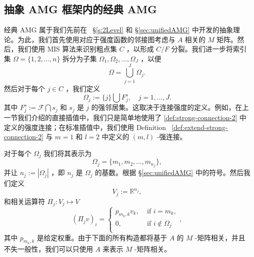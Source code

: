 \documentclass[12pt]{acta_2011xz}
\begin{document}
   \subsection{抽象 AMG 框架内的经典 AMG  }       \label{sec:CAMG-coarse}    经典 AMG 属于我们先前在~    \S       \ref{s:2Level}    和    \S       \ref{sec:unifiedAMG}    中开发的抽象理论。为此，我们首先使用对应于强度函数的邻接图考虑与    $A$    相关的    $M$    矩阵。然后，我们使用 MIS 算法来识别粗点集    $C$    ，以形成
   $C/F$    分裂。我们进一步将索引集    $\Omega= \{ 1, 2,
\dots, n \} $    拆分为子集    $\Omega_1, \Omega_2, \dots, \Omega_J$    ，以便
   \begin{equation}\label{Omegaj}
\Omega=\bigcup_{j=1}^J\Omega_j.
\end{equation}    然后对于每个    $j\in C$   ，我们定义 
   \begin{equation}\label{CAMG_Omega}
    \Omega_j:= \{ j \} \bigcup F_j^s, \quad j=1, \dots, J.
\end{equation}    其中    $F_j^s:=\mathcal F\bigcap s_j$    和    $s_j$    是    $j$    的强邻居集。这取决于连接强度的定义。例如，在上一节我们介绍的直接插值中，我们只是简单地使用了    \eqref{def:strong-connection-2}    中定义的强度连接；在标准插值中，我们使用 Definition~    \ref{def:extend-strong-connection-2}    与    $m=1$    和    $l=2$    中定义的    $(m, l)$    -强连接。  

对于每个    $\Omega_j$    我们将其表示为 
   \begin{equation}
    \Omega_j= \{ m_1, m_2, \dots, m_{n_j} \} ,
\end{equation}    并让    $n_j:=|\Omega_j|$    ，即    $n_j$    是    $\Omega_j$    的基数。根据    \S       \ref{sec:unifiedAMG}    中的符号。然后我们定义 
   \begin{equation}
    V_j:=\mathbb{R}^{n_j},
\end{equation}    和相关运算符    $\Pi_j: V_j\mapsto V$    
   \begin{equation}\label{pi-camg}
 (\Pi_jv)_i = \begin{cases}
        p_{m_k,k}v_{k}, & \text{ if } i=m_k, \\ 
        0, & \text{ if } i\notin \Omega_j \\ 
    \end{cases},
\end{equation}    其中    $p_{m_k,k}$    是给定权重。由于下面的所有构造都将基于    $A$    的    $M$    -矩阵相关，并且不失一般性，我们可以只使用    $A$    来表示    $M$    -矩阵相关。  
\end{document}

